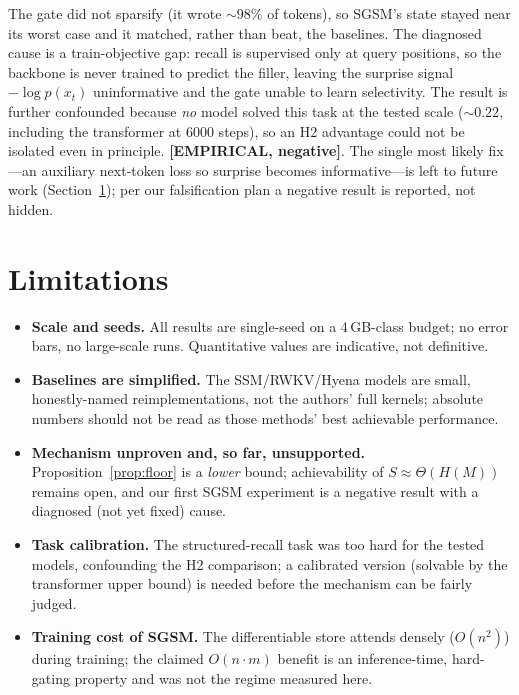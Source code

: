 \noindent The gate did not sparsify (it wrote $\sim 98\%$ of tokens), so SGSM's state stayed near
its worst case and it matched, rather than beat, the baselines. The diagnosed cause is a
train-objective gap: recall is supervised only at query positions, so the backbone is never
trained to predict the filler, leaving the surprise signal $-\log p(x_t)$ uninformative and the
gate unable to learn selectivity. The result is further confounded because \emph{no} model solved
this task at the tested scale ($\sim 0.22$, including the transformer at $6000$ steps), so an H2
advantage could not be isolated even in principle. \textbf{[EMPIRICAL, negative]}. The single most
likely fix---an auxiliary next-token loss so surprise becomes informative---is left to future work
(Section~\ref{sec:limitations}); per our falsification plan a negative result is reported, not
hidden.

\section{Limitations}
\label{sec:limitations}
\begin{itemize}
\item \textbf{Scale and seeds.} All results are single-seed on a 4\,GB-class budget; no error bars,
no large-scale runs. Quantitative values are indicative, not definitive.
\item \textbf{Baselines are simplified.} The SSM/RWKV/Hyena models are small, honestly-named
reimplementations, not the authors' full kernels; absolute numbers should not be read as those
methods' best achievable performance.
\item \textbf{Mechanism unproven and, so far, unsupported.} Proposition~\ref{prop:floor} is a
\emph{lower} bound; achievability of $S\approx\Theta(H(M))$ remains open, and our first SGSM
experiment is a negative result with a diagnosed (not yet fixed) cause.
\item \textbf{Task calibration.} The structured-recall task was too hard for the tested models,
confounding the H2 comparison; a calibrated version (solvable by the transformer upper bound) is
needed before the mechanism can be fairly judged.
\item \textbf{Training cost of SGSM.} The differentiable store attends densely ($O(n^2)$) during
training; the claimed $O(n\cdot m)$ benefit is an inference-time, hard-gating property and was not
the regime measured here.
\end{itemize}
